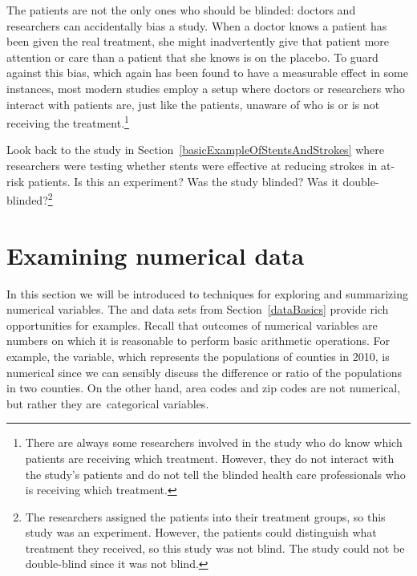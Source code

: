 The patients are not the only ones who should be blinded: doctors and researchers can accidentally bias a study. When a doctor knows a patient has been given the real treatment, she might inadvertently give that patient more attention or care than a patient that she knows is on the placebo. To guard against this bias, which again has been found to have a measurable effect in some instances, most modern studies employ a  setup where doctors or researchers who interact with patients are, just like the patients, unaware of who is or is not receiving the treatment.\footnote{There are always some researchers involved in the study who do know which patients are receiving which treatment. However, they do not interact with the study's patients and do not tell the blinded health care professionals who is receiving which treatment.}

\begin{exercise}
Look back to the study in Section~\ref{basicExampleOfStentsAndStrokes} where researchers were testing whether stents were effective at reducing strokes in at-risk patients. Is this an experiment? Was the study blinded? Was it double-blinded?\footnote{The researchers assigned the patients into their treatment groups, so this study was an experiment. However, the patients could distinguish what treatment they received, so this study was not blind. The study could not be double-blind since it was not blind.}
\end{exercise}


\section[Examining numerical data]{Examining numerical data }
\label{numericalData}

In this section we will be introduced to techniques for exploring and summarizing numerical variables. The  and  data sets from Section~\ref{dataBasics} provide rich opportunities for examples. Recall that outcomes of numerical variables are numbers on which it is reasonable to perform basic arithmetic operations. For example, the  variable, which represents the populations of counties in 2010, is numerical since we can sensibly discuss the difference or ratio of the populations in two counties. On the other hand, area codes and zip codes are not numerical, but rather they are~categorical variables.


